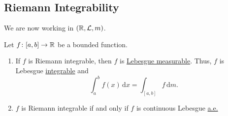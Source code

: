 \subsection{Riemann Integrability}
We are now working in \((\mathbb{\MakeUppercase{r}} , \mathcal{\MakeUppercase{l}} , m)\).

\begin{theorem}
	Let \(f\colon [a, b]\to \mathbb{\MakeUppercase{r}} \) be a bounded function.
	\begin{enumerate}
		\item If \(f\) is Riemann integrable, then \(f\) is \hyperref[def:Lebesgue-measurable-function]{Lebesgue measurable}.
		      Thus, \(f\) is Lebesgue \hyperref[def:integrable]{integrable} and
		      \[
			      \int_{a}^{b} f(x) \,\mathrm{d}x = \int_{[a, b]}f  \,\mathrm{d}m.
		      \]
		\item \(f\) is Riemann integrable if and only if \(f\) is continuous Lebesgue \hyperref[def:mu-almost-everywhere]{a.e.}
	\end{enumerate}
\end{theorem}